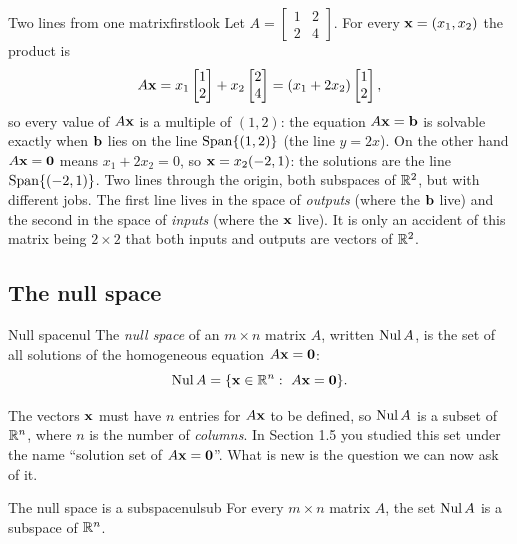 \documentclass[11pt]{article}
\begin{document}
\begin{exmp}{Two lines from one matrix}{firstlook}
Let $A=\begin{bmatrix}1&2\\2&4\end{bmatrix}$. For every $\mathbf{x}=(x_1,x_2)$ the product is
\[
A\mathbf{x}=x_1\begin{bmatrix}1\\2\end{bmatrix}+x_2\begin{bmatrix}2\\4\end{bmatrix}=(x_1+2x_2)\begin{bmatrix}1\\2\end{bmatrix},
\]
so every value of $A\mathbf{x}$ is a multiple of $(1,2)$: the equation $A\mathbf{x}=\mathbf{b}$ is solvable exactly when $\mathbf{b}$ lies on the line $\operatorname{Span}\{(1,2)\}$ (the line $y=2x$). On the other hand $A\mathbf{x}=\mathbf{0}$ means $x_1+2x_2=0$, so $\mathbf{x}=x_2(-2,1)$: the solutions are the line $\operatorname{Span}\{(-2,1)\}$. Two lines through the origin, both subspaces of $\mathbb{R}^2$, but with different jobs. The first line lives in the space of \emph{outputs} (where the $\mathbf{b}$ live) and the second in the space of \emph{inputs} (where the $\mathbf{x}$ live). It is only an accident of this matrix being $2\times2$ that both inputs and outputs are vectors of $\mathbb{R}^2$.
\end{exmp}

\subsection*{The null space}

\begin{defn}{Null space}{nul}
The \emph{null space} of an $m\times n$ matrix $A$, written $\operatorname{Nul} A$, is the set of all solutions of the homogeneous equation $A\mathbf{x}=\mathbf{0}$:
\[
\Nul A=\{\bv{x}\in\R^n:\ A\bv{x}=\bv{0}\}.
\]
\end{defn}

The vectors $\mathbf{x}$ must have $n$ entries for $A\mathbf{x}$ to be defined, so $\operatorname{Nul} A$ is a subset of $\mathbb{R}^n$, where $n$ is the number of \emph{columns}. In Section 1.5 you studied this set under the name ``solution set of $A\mathbf{x}=\mathbf{0}$''. What is new is the question we can now ask of it.

\begin{thm}{The null space is a subspace}{nulsub}
For every $m\times n$ matrix $A$, the set $\operatorname{Nul} A$ is a subspace of $\mathbb{R}^n$.
\end{thm}
\end{document}
